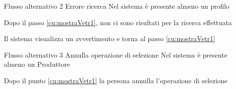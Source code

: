 %
%
{Flusso alternativo 2}%
{Errore ricerca}%
{Nel sistema è presente almeno un profilo}%
{\postNulle}%
{\begin{enumCU}
	\item Dopo il passo \ref{cu:mostraVetr1}, non ci sono risultati per la ricerca effettuata
	\item Il sistema visualizza un avvertimento e torna al passo \ref{cu:mostraVetr1}
\end{enumCU}}%
%	
{Flusso alternativo 3}%
{Annulla operazione di selezione}%
{Nel sistema è presente almeno un Produttore}%
{\postNulle}%
{\begin{enumCU}
		\item Dopo il punto \ref{cu:mostraVetr1} la persona annulla l'operazione di selezione
\end{enumCU}}%

\tabcuvspace


%
%

